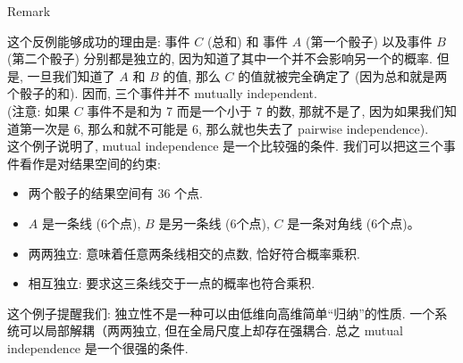 \documentclass{qlnotes-export}
\begin{document}
\begin{qlremark}{Remark}

这个反例能够成功的理由是: 事件 \(C\) (总和) 和 事件 \(A\) (第一个骰子) 以及事件 \(B\) (第二个骰子) 分别都是独立的, 因为知道了其中一个并不会影响另一个的概率. 但是, 一旦我们知道了 \(A\) 和 \(B\) 的值, 那么 \(C\) 的值就被完全确定了 (因为总和就是两个骰子的和). 因而, 三个事件并不 mutually independent.\\
(注意: 如果 \(C\) 事件不是和为 7 而是一个小于 7 的数, 那就不是了, 因为如果我们知道第一次是 6, 那么和就不可能是 6, 那么就也失去了 pairwise independence).\\
这个例子说明了, mutual independence 是一个比较强的条件. 我们可以把这三个事件看作是对结果空间的约束:

\begin{itemize}
\item
  两个骰子的结果空间有 36 个点.
\item
  \(A\) 是一条线 (6个点), \(B\) 是另一条线 (6个点), \(C\) 是一条对角线 (6个点)。
\item
  两两独立: 意味着任意两条线相交的点数, 恰好符合概率乘积.
\item
  相互独立: 要求这三条线交于一点的概率也符合乘积.
\end{itemize}

这个例子提醒我们: 独立性不是一种可以由低维向高维简单``归纳''的性质. 一个系统可以局部解耦（两两独立, 但在全局尺度上却存在强耦合. 总之 mutual independence 是一个很强的条件.

\end{qlremark}
\end{document}
